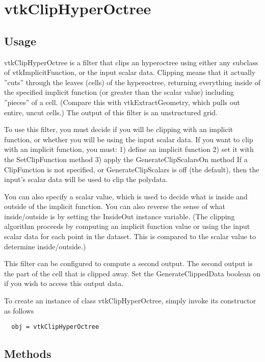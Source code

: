 \section{vtkClipHyperOctree}

\subsection{Usage}

 vtkClipHyperOctree is a filter that clips an hyperoctree using either
 any subclass of vtkImplicitFunction, or the input scalar
 data. Clipping means that it actually ''cuts'' through the leaves (cells) of
 the hyperoctree, returning everything inside of the specified implicit
 function (or greater than the scalar value) including ''pieces'' of
 a cell. (Compare this with vtkExtractGeometry, which pulls out
 entire, uncut cells.) The output of this filter is an unstructured
 grid.

 To use this filter, you must decide if you will be clipping with an
 implicit function, or whether you will be using the input scalar
 data.  If you want to clip with an implicit function, you must:
 1) define an implicit function
 2) set it with the SetClipFunction method
 3) apply the GenerateClipScalarsOn method
 If a ClipFunction is not specified, or GenerateClipScalars is off
 (the default), then the input's scalar data will be used to clip
 the polydata.

 You can also specify a scalar value, which is used to decide what is
 inside and outside of the implicit function. You can also reverse the
 sense of what inside/outside is by setting the InsideOut instance
 variable. (The clipping algorithm proceeds by computing an implicit
 function value or using the input scalar data for each point in the
 dataset. This is compared to the scalar value to determine
 inside/outside.)

 This filter can be configured to compute a second output. The
 second output is the part of the cell that is clipped away. Set the
 GenerateClippedData boolean on if you wish to access this output data.

To create an instance of class vtkClipHyperOctree, simply
invoke its constructor as follows
\begin{verbatim}
  obj = vtkClipHyperOctree
\end{verbatim}
\subsection{Methods}

